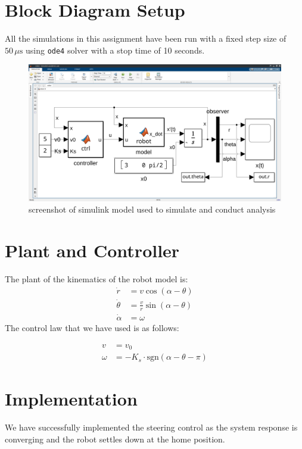 \documentclass[12pt]{article}
\begin{document}
\pagebreak

\section{Block Diagram Setup}
All the simulations in this assignment have been run with a fixed step size of \(50\,\mu\text{s}\) using \texttt{ode4} solver with a stop time of 10 seconds.

\begin{figure}[ht!]
	\centering
	\includegraphics[width=0.6\linewidth]{images/simulink.png}
	\caption{screenshot of simulink model used to simulate and conduct analysis}
\end{figure}

\section{Plant and Controller}

The plant of the kinematics of the robot model is:
\[\begin{aligned}
	\dot{r} &= v\cos(\alpha-\theta) \\
	\dot{\theta} &= \frac{v}{r}\sin(\alpha-\theta)\\
	\dot{\alpha} &= \omega
\end{aligned}\]
The control law that we have used is as follows:

\[\begin{aligned}
	v &= v_0 \\
	\omega &= -K_s \cdot \text{sgn}(\alpha - \theta - \pi)
\end{aligned}\]

\section{Implementation}
We have successfully implemented the steering control as the system response is converging and the robot settles down at the home position.
\end{document}
